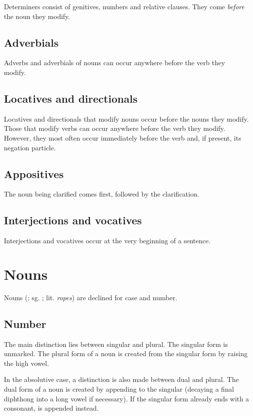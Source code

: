 \documentclass{book}
\begin{document}
Determiners consist of genitives, numbers and relative clauses. They come \emph{before} the noun they modify.

\section{Adverbials}

Adverbs and adverbials of nouns can occur anywhere before the verb they modify.

\section{Locatives and directionals}

Locatives and directionals that modify nouns occur before the nouns they modify. Those that modify verbs can occur anywhere before the verb they modify. However, they most often occur immediately before the verb and, if present, its negation particle.

\section{Appositives}

The noun being clarified comes first, followed by the clarification.

\section{Interjections and vocatives}

Interjections and vocatives occur at the very beginning of a sentence.

\chapter{Nouns}

Nouns (; sg. ; lit. \emph{ropes}) are declined for case and number.

\section{Number}

The main distinction lies between singular and plural. The singular form is unmarked. The plural form of a noun is created from the singular form by raising the high vowel.

In the absolutive case, a distinction is also made between dual and plural. The dual form of a noun is created by appending  to the singular (decaying a final diphthong into a long vowel if necessary). If the singular form already ends with a consonant,  is appended instead.
\end{document}
